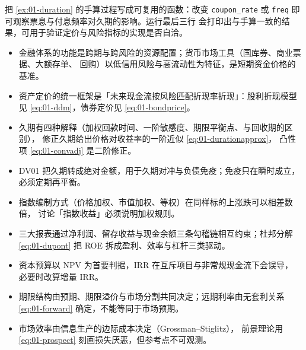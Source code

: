  把 \cref{ex:01-duration} 的手算过程写成可复用的函数：改变
\texttt{coupon\_rate} 或 \texttt{freq} 即可观察票息与付息频率对久期的影响。运行最后三行
会打印出与手算一致的结果，可用于验证定价与风险指标的实现是否自洽。

\begin{summarybox}
\begin{itemize}[leftmargin=1.4em, itemsep=2pt]
  \item 金融体系的功能是跨期与跨风险的资源配置；货币市场工具（国库券、商业票据、大额存单、
        回购）以低信用风险与高流动性为特征，是短期资金价格的基准。
  \item 资产定价的统一框架是「未来现金流按风险匹配折现率折现」：股利折现模型见
        \cref{eq:01-ddm}，债券定价见 \cref{eq:01-bondprice}。
  \item 久期有四种解释（加权回款时间、一阶敏感度、期限平衡点、与回收期的区别），
        修正久期给出价格对收益率的一阶近似 \cref{eq:01-durationapprox}，
        凸性项 \cref{eq:01-convadj} 是二阶修正。
  \item DV01 把久期转成绝对金额，用于久期对冲与负债免疫；免疫只在瞬时成立，必须定期再平衡。
  \item 指数编制方式（价格加权、市值加权、等权）在同样标的上涨跌可以相差数倍，
        讨论「指数收益」必须说明加权规则。
  \item 三大报表通过净利润、留存收益与现金余额三条勾稽链相互约束；杜邦分解
        \cref{eq:01-dupont} 把 ROE 拆成盈利、效率与杠杆三类驱动。
  \item 资本预算以 NPV 为首要判据，IRR 在互斥项目与非常规现金流下会误导，
        必要时改算增量 IRR。
  \item 期限结构由预期、期限溢价与市场分割共同决定；远期利率由无套利关系
        \cref{eq:01-forward} 确定，不能等同于市场预期。
  \item 市场效率由信息生产的边际成本决定（Grossman--Stiglitz），
        前景理论用 \cref{eq:01-prospect} 刻画损失厌恶，但参考点不可观测。
\end{itemize}
\end{summarybox}

